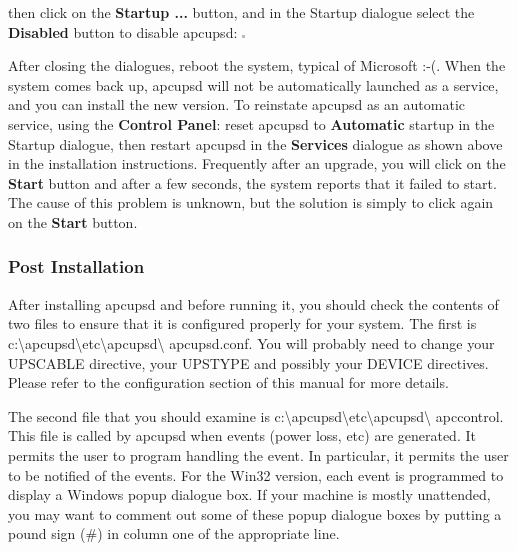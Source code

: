 {{{{{{{{{{then click on the {\bf Startup ...} button, and in the Startup dialogue select
the {\bf Disabled} button to disable apcupsd: 
\includegraphics{./wininstall7.eps}  

After closing the dialogues, reboot the system, typical of Microsoft :-(. When
the system comes back up, apcupsd will not be automatically launched as a
service, and you can install the new version. To reinstate apcupsd as an
automatic service, using the {\bf Control Panel}: reset apcupsd to {\bf
Automatic} startup in the Startup dialogue, then restart apcupsd in the {\bf
Services} dialogue as shown above in the installation instructions. Frequently
after an upgrade, you will click on the {\bf Start} button and after a few
seconds, the system reports that it failed to start. The cause of this problem
is unknown, but the solution is simply to click again on the {\bf Start}
button. 

\label{Post-Installation}

\subsubsection*{Post Installation}

\label{index-Windows_002c-Post-Installation-177}
After installing apcupsd and before running it, you should check the contents
of two files to ensure that it is configured properly for your system. The
first is
c:\textbackslash{}apcupsd\textbackslash{}etc\textbackslash{}apcupsd\textbackslash
{}apcupsd.conf. You will probably need to change your UPSCABLE directive, your
UPSTYPE and possibly your DEVICE directives. Please refer to the configuration
section of this manual for more details.  

The second file that you should examine is
c:\textbackslash{}apcupsd\textbackslash{}etc\textbackslash{}apcupsd\textbackslash
{}apccontrol. This file is called by apcupsd when events (power loss, etc) are
generated. It permits the user to program handling the event. In particular,
it permits the user to be notified of the events. For the Win32 version, each
event is programmed to display a Windows popup dialogue box. If your machine
is mostly unattended, you may want to comment out some of these popup dialogue
boxes by putting a pound sign (\#) in column one of the appropriate line. 

}}}}}}}}}}
